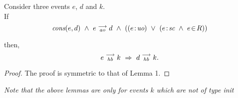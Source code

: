     \begin{lemma}Consider three events $e$, $d$ and $k$. \\
    
        If
            \[
                \cons{e}{d} \ \wedge \ \reln{e}{ao}{d} \ \wedge \
                (
                    (\et{e}{uo}) \ \vee \
                    (\et{e}{sc} \ \wedge \ \event{e}{R})
                )
            \]
            
        then,
            \[
                \reln{e}{hb}{k}\ \Rightarrow\ \reln{d}{hb}{k}.
            \]
    \end{lemma}
    
    \begin{proof}
        The proof is symmetric to that of Lemma 1. 
    \end{proof}

    \emph{Note that the above lemmas are only for events $k$ which are not of type \textit{init}}
    